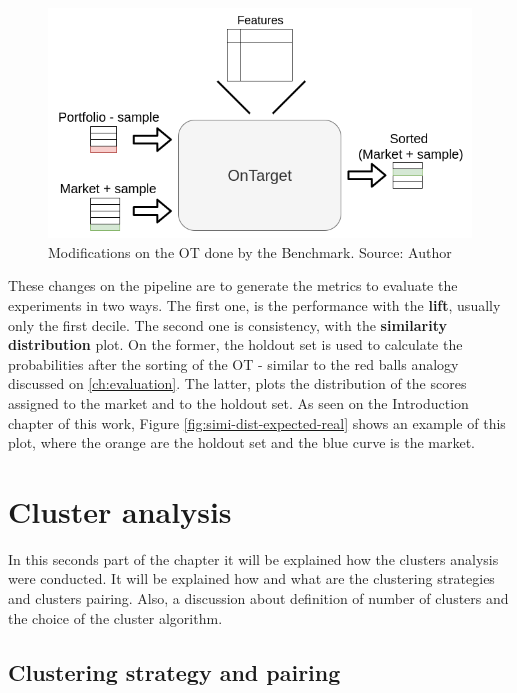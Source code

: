 \begin{figure}[h]
   \centering
   \includegraphics[width=\linewidth]{fig/ch3-ot-benchmark-blocks.png}
   \caption{Modifications on the OT done by the Benchmark. Source: Author}
   \label{fig:ot-benchmark-blocks}
\end{figure}

These changes on the pipeline are to generate the metrics to evaluate the experiments in two ways. The first one, is the performance with the \textbf{lift}, usually only the first decile. The second one is consistency, with the \textbf{similarity distribution} plot. On the former, the holdout set is used to calculate the probabilities after the sorting of the OT - similar to the red balls analogy discussed on \ref{ch:evaluation}. The latter, plots the distribution of the scores assigned to the market and to the holdout set. As seen on the Introduction chapter of this work, Figure \ref{fig:simi-dist-expected-real} shows an example of this plot, where the orange are the holdout set and the blue curve is the market.

\section{Cluster analysis}

In this seconds part of the chapter it will be explained how the clusters analysis were conducted. It will be explained how and what are the clustering strategies and clusters pairing. Also, a discussion about definition of number of clusters and the choice of the cluster algorithm.

\subsection{Clustering strategy and pairing}

